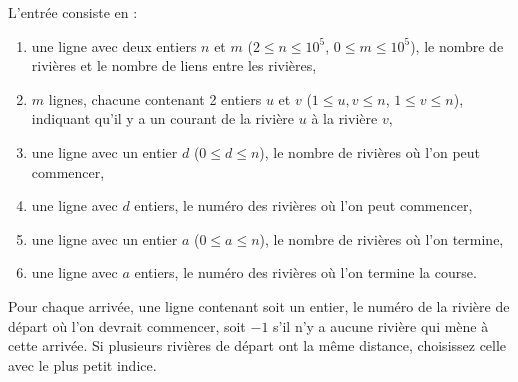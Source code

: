 \begin{Input}
    L'entrée consiste en :
    \begin{enumerate}
        \item une ligne avec deux entiers $n$ et $m$ ($2 \le n \le 10^5$, $0 \le m \le 10^5$), le nombre de rivières et le nombre de liens entre les rivières,
        \item $m$ lignes, chacune contenant 2 entiers $u$ et $v$ ($1 \le u,v \le n$, $1 \le v \le n$), indiquant qu'il y a un courant de la rivière $u$ à la rivière $v$,
        \item une ligne avec un entier $d$ ($0 \le d \le n$), le nombre de rivières où l'on peut commencer,
        \item une ligne avec $d$ entiers, le numéro des rivières où l'on peut commencer,
        \item une ligne avec un entier $a$ ($ 0 \le a \le n$), le nombre de rivières où l'on termine,
        \item une ligne avec $a$ entiers, le numéro des rivières où l'on termine la course.
    \end{enumerate}
\end{Input}

\begin{Output}
    Pour chaque arrivée, une ligne contenant soit un entier, le numéro de la rivière de départ où l'on devrait commencer, soit $-1$ s'il n'y a aucune rivière qui mène à cette arrivée. Si plusieurs rivières de départ ont la même distance, choisissez celle avec le plus petit indice.
\end{Output}
